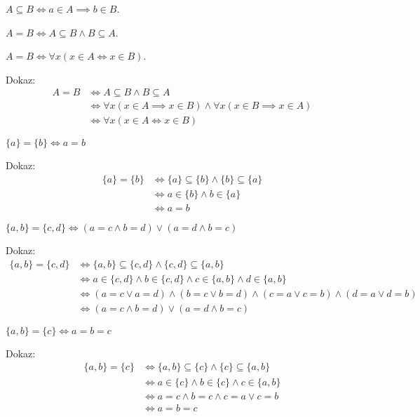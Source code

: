 \begin{definicija}
    $A \subseteq B \iff a \in A \implies b \in B$.
\end{definicija}

\begin{definicija}
    $A = B \iff A \subseteq B \wedge B \subseteq A$.
\end{definicija}

\begin{trditev}
    $A = B \iff \forall x (x \in A \iff x \in B)$.
\end{trditev}
Dokaz:
\begin{align*}
    A = B &\iff A \subseteq B \wedge B \subseteq A \\
    &\iff \forall x (x \in A \implies x \in B) \wedge \forall x (x \in B \implies x \in A) \\
    &\iff \forall x (x \in A \iff x \in B)
\end{align*}

\begin{trditev}
    $\{a\} = \{b\} \iff a = b$
\end{trditev}
Dokaz:
\begin{align*}
    \{a\} = \{b\} &\iff \{a\} \subseteq \{b\} \wedge \{b\} \subseteq \{a\} \\
    &\iff a \in \{b\} \wedge b \in \{a\} \\
    &\iff a = b
\end{align*}

\begin{trditev}
    $\{a, b\} = \{c, d\} \iff (a = c \wedge b = d) \vee (a = d \wedge b = c)$
\end{trditev}
Dokaz:
\begin{align*}
    \{a, b\} = \{c, d\} &\iff \{a, b\} \subseteq \{c, d\} \wedge \{c, d\} \subseteq \{a, b\} \\
    &\iff a \in \{c, d\} \wedge b \in \{c, d\} \wedge c \in \{a, b\} \wedge d \in \{a, b\} \\
    &\iff (a = c \vee a = d) \wedge (b = c \vee b = d) \wedge (c = a \vee c = b) \wedge (d = a \vee d = b) \\
    &\iff (a = c \wedge b = d) \vee (a = d \wedge b = c)
\end{align*}

\begin{trditev}
    $\{a, b\} = \{c\} \iff a = b = c$
\end{trditev}
Dokaz:
\begin{align*}
    \{a, b\} = \{c\} &\iff \{a, b\} \subseteq \{c\} \wedge \{c\} \subseteq \{a, b\} \\
    &\iff a \in \{c\} \wedge b \in \{c\} \wedge c \in \{a, b\} \\
    &\iff a = c \wedge b = c \wedge c = a \vee c = b \\
    &\iff a = b = c
\end{align*}

